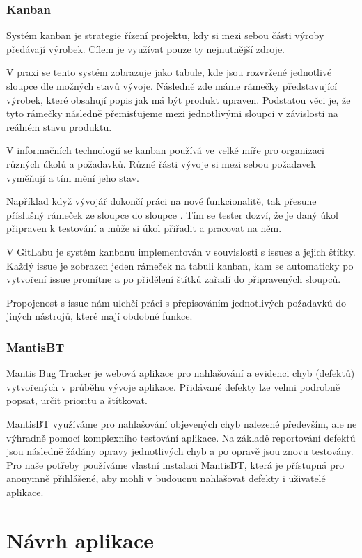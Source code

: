 \documentclass[czech,BP]{thesiskiv}
\begin{document}
\subsubsection{Kanban}
\par Systém kanban je strategie řízení projektu, kdy si mezi sebou části výroby předávají výrobek. Cílem je využívat pouze ty nejnutnější zdroje.
\par V praxi se tento systém zobrazuje jako tabule, kde jsou rozvržené jednotlivé sloupce dle možných stavů vývoje. Následně zde máme rámečky představující výrobek, které obsahují popis jak má být produkt upraven. Podstatou věci je, že tyto rámečky následně přemisťujeme mezi jednotlivými sloupci v závislosti na reálném stavu produktu.
\par V informačních technologií se kanban používá ve velké míře pro organizaci různých úkolů a požadavků. Různé řásti vývoje si mezi sebou požadavek vyměňují a tím mění jeho stav.
\par Například když vývojář dokončí práci na nové funkcionalitě, tak přesune příslušný rámeček ze sloupce  do sloupce . Tím se tester dozví, že je daný úkol připraven k testování a může si úkol přiřadit a pracovat na něm.
\par V GitLabu je systém kanbanu implementován v souvislosti s issues a jejich štítky. Každý issue je zobrazen jeden rámeček na tabuli kanban, kam se automaticky po vytvoření issue promítne a po přidělení štítků zařadí do připravených sloupců.
\par Propojenost s issue nám ulehčí práci s přepisováním jednotlivých požadavků do jiných nástrojů, které mají obdobné funkce.
\subsubsection{MantisBT}
\par Mantis Bug Tracker je webová aplikace pro nahlašování a evidenci chyb (defektů) vytvořených v průběhu vývoje aplikace. Přidávané defekty lze velmi podrobně popsat, určit prioritu a štítkovat.
\par MantisBT využíváme pro nahlašování objevených chyb nalezené především, ale ne výhradně pomocí komplexního testování aplikace. Na základě reportování defektů jsou následně žádány opravy jednotlivých chyb a po opravě jsou znovu testovány. Pro naše potřeby používáme vlastní instalaci MantisBT, která je přístupná pro anonymně přihlášené, aby mohli v budoucnu nahlašovat defekty i uživatelé aplikace.
\section{Návrh aplikace} 
\end{document}
